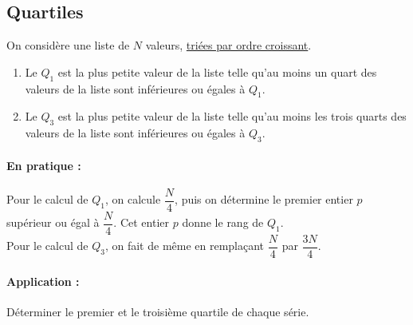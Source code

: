 \bigskip


\subsection{Quartiles}

\begin{definition}
  On considère une liste de $N$ valeurs, \underline{triées par ordre
    croissant}. 
  \begin{enumerate}
      \item Le  $Q_1$ est la plus petite valeur de
    la liste telle qu'au moins un quart des valeurs de la liste sont
    inférieures ou égales à $Q_1$.
\item Le  $Q_3$ est la plus petite valeur de
    la liste telle qu'au moins les trois quarts des valeurs de la
    liste sont inférieures ou égales à $Q_3$.
  \end{enumerate}

    
\end{definition}

\bigskip

\paragraph{En pratique :}
  Pour le calcul de $Q_1$, on calcule $\dfrac{N}4$, puis on détermine
  le premier entier $p$ supérieur ou égal à $\dfrac{N}4$. Cet entier
  $p$ donne le rang de $Q_1$. \\
  Pour le calcul de $Q_3$, on fait de même en remplaçant $\dfrac{N}4$
  par $\dfrac{3N}4$. 


\bigskip



\bigskip


\paragraph{Application :}Déterminer le premier et le troisième quartile
  de chaque série.

